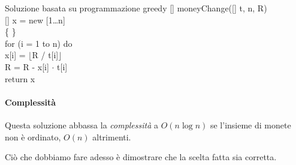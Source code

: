 \begin{minicode}{Soluzione basata su programmazione greedy}
\ind{}[] moneyChange([] t,  n,  R)\\
    [] x = new [1\dots n]\\
    \{  \}\\
    \indf for (i = 1 to n) do\\
        x[i] = $\lfloor$R / t[i]$\rfloor$\\
        R = R - x[i] $\cdot$ t[i]\\
    \indf return x
\end{minicode}

\paragraph{Complessità}
Questa soluzione abbassa la \emph{complessità} a $O(n\log n)$ se l'insieme di
monete non è ordinato, $O(n)$ altrimenti.

\bigskip\noindent
Ciò che dobbiamo fare adesso è dimostrare che la scelta fatta sia corretta.

